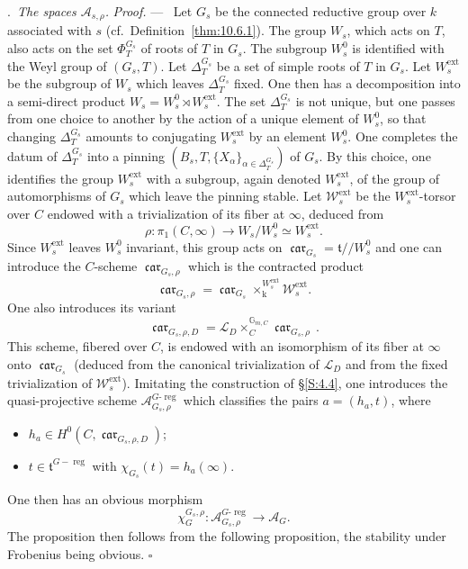 \documentclass[12pt,a4paper,oneside,english,leqno]{smfart}
\makeatletter
\numberwithin{equation}{subsection}
\numberwithin{theo}{subsection}
\newenvironment{paragr}[1][]{\medskip\refstepcounter{subsection}%
  \par\noindent\hspace*{\parindent}\thesubsection.\ \emph{#1}%
  \@ifundefined{@empty}{}{}\ignorespaces}{\medskip}
\theoremstyle{plain}
\theoremstyle{definition}
\theoremstyle{remark}
\newenvironment{preuve}[1][]{\medskip\noindent\textit{Proof.} #1 ---\ }%
  {\hfill\ensuremath{\square}\medskip}
\DeclareMathOperator{\reg}{reg}
\DeclareMathOperator{\car}{\mathfrak{car}}
\newcommand{\wc}{\mathcal{W}}
\newcommand{\lc}{\mathcal{L}}
\newcommand{\Ac}{\mathcal{A}}
\newcommand{\tgo}{\mathfrak{t}}
\newcommand{\al}{\alpha}
\makeatother
\begin{document}
\begin{paragr}[The spaces $\Ac_{s,\rho}$.]
\begin{preuve}
Let $G_s$ be the connected reductive group over $k$ associated with $s$ (cf.\ Definition~\ref{thm:10.6.1}). The group $W_s$, which acts on $T$, also acts on the set $\Phi_T^{G_s}$ of roots of $T$ in $G_s$. The subgroup $W_s^0$ is identified with the Weyl group of $(G_s,T)$. Let $\Delta_T^{G_s}$ be a set of simple roots of $T$ in $G_s$. Let $W_s^{\mathrm{ext}}$ be the subgroup of $W_s$ which leaves $\Delta_T^{G_s}$ fixed. One then has a decomposition into a semi-direct product $W_s = W_s^0\rtimes W_s^{\mathrm{ext}}$. The set $\Delta_T^{G_s}$ is not unique, but one passes from one choice to another by the action of a unique element of $W_s^0$, so that changing $\Delta_T^{G_s}$ amounts to conjugating $W_s^{\mathrm{ext}}$ by an element $W_s^0$. One completes the datum of $\Delta_T^{G_s}$ into a pinning $(B_s,T,\{X_\al\}_{\al\in\Delta_T^{G_s}})$ of $G_s$. By this choice, one identifies the group $W_s^{\mathrm{ext}}$ with a subgroup, again denoted $W_s^{\mathrm{ext}}$, of the group of automorphisms of $G_s$ which leave the pinning stable. Let $\wc_s^{\mathrm{ext}}$ be the $W_s^{\mathrm{ext}}$-torsor over $C$ endowed with a trivialization of its fiber at $\infty$, deduced from
$$\rho : \pi_1(C,\infty)\to W_s/W_s^0\simeq W_s^{\mathrm{ext}}.$$
Since $W_s^{\mathrm{ext}}$ leaves $W_s^0$ invariant, this group acts on $\car_{G_s} = \tgo//W_s^0$ and one can introduce the $C$-scheme $\car_{G_s,\rho}$ which is the contracted product
$$\car_{G_s,\rho} = \car_{G_s}\times_{\mathrm{k}}^{W_s^{\mathrm{ext}}}\wc_s^{\mathrm{ext}}.$$
One also introduces its variant
$$\car_{G_s,\rho,D} = \lc_D\times_C^{\mathbb{G}_{m,C}}\car_{G_s,\rho}\,.$$
This scheme, fibered over $C$, is endowed with an isomorphism of its fiber at $\infty$ onto $\car_{G_s}$ (deduced from the canonical trivialization of $\lc_D$ and from the fixed trivialization of $\wc_s^{\mathrm{ext}}$). Imitating the construction of \S\ref{S:4.4}, one introduces the quasi-projective scheme $\Ac_{G_s,\rho}^{G\text{-}\reg}$ which classifies the pairs $a = (h_a,t)$, where
\begin{itemize}
\item[--] $h_a\in H^0(C,\car_{G_s,\rho,D})$; \item[--] $t\in\tgo^{G-\reg}$ with $\chi_{G_s}(t) = h_a(\infty)$.
\end{itemize}
One then has an obvious morphism
$$\chi_G^{G_s,\rho} : \Ac_{G_s,\rho}^{G\text{-}\reg}\to\Ac_G.$$
The proposition then follows from the following proposition, the stability under Frobenius being obvious.
\end{preuve}


\end{paragr}
\end{document}
